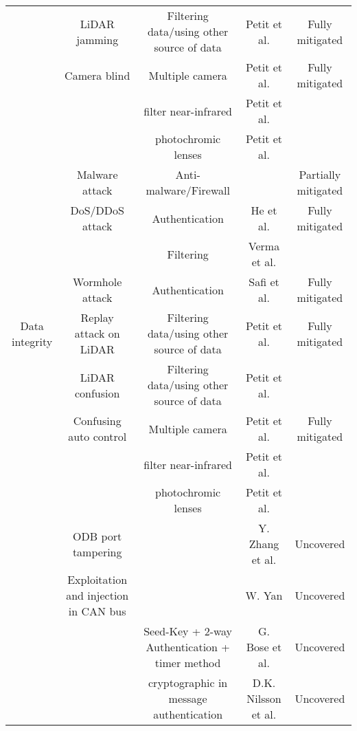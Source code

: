 \begin{table*}[t]
\begin{tabular}{*{5}{c}}
    & LiDAR jamming & Filtering data/using other source of data & Petit et al. & Fully mitigated\\
    
    & Camera blind & Multiple camera & Petit et al. & Fully mitigated \\
    & & filter near-infrared & Petit et al. &  \\

    & & photochromic lenses & Petit et al. &  \\
    
    & Malware attack & Anti-malware/Firewall & & Partially mitigated\\
    
    & DoS/DDoS attack & Authentication & He et al. & Fully mitigated\\
    
    & & Filtering & Verma et al. & \\
    
    & Wormhole attack & Authentication & Safi et al. & Fully mitigated \\
    
    \hline
    
    Data integrity & Replay attack on LiDAR & Filtering data/using other source of data & Petit et al. & Fully mitigated\\
    
    & LiDAR confusion & Filtering data/using other source of data & Petit et al. & \\
    
    & Confusing auto control & Multiple camera & Petit et al. & Fully mitigated \\
    
    & & filter near-infrared & Petit et al. & \\
    
    & & photochromic lenses & Petit et al. & \\
    
    & ODB port tampering &  & Y. Zhang et al. & Uncovered\\
    
    & Exploitation and injection in CAN bus & & W. Yan & Uncovered\\
    
    & & Seed-Key + 2-way Authentication + timer method & G. Bose et al. & Uncovered\\
    
    & & cryptographic in message authentication & D.K. Nilsson et al. & Uncovered\\
    

\end{tabular}
\end{table*}
